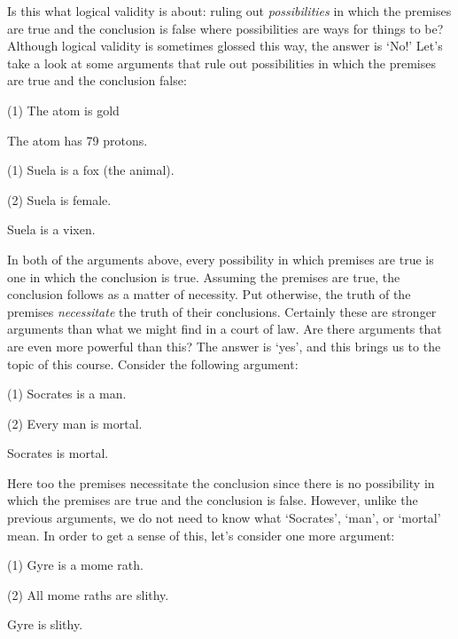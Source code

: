 Is this what logical validity is about: ruling out \textit{possibilities} in which the premises are true and the conclusion is false where possibilities are ways for things to be?
Although logical validity is sometimes glossed this way, the answer is `No!'
Let's take a look at some arguments that rule out possibilities in which the premises are true and the conclusion false:

\begin{earg}
  \item[(1)] The atom is gold
  \item[\therefore] The atom has 79 protons.
\end{earg}


\begin{earg}
  \item[(1)] Suela is a fox (the animal).
  \item[(2)] Suela is female.
  \item[\therefore] Suela is a vixen.
\end{earg}

In both of the arguments above, every possibility in which premises are true is one in which the conclusion is true.
Assuming the premises are true, the conclusion follows as a matter of necessity.
Put otherwise, the truth of the premises \emph{necessitate} the truth of their conclusions.
Certainly these are stronger arguments than what we might find in a court of law.
Are there arguments that are even more powerful than this?
The answer is `yes', and this brings us to the topic of this course.
Consider the following argument:

\begin{earg}
  \item[(1)] Socrates is a man.
  \item[(2)] Every man is mortal.
  \item[\therefore] Socrates is mortal.
\end{earg}

Here too the premises necessitate the conclusion since there is no possibility in which the premises are true and the conclusion is false.
However, unlike the previous arguments, we do not need to know what `Socrates', `man', or `mortal' mean.
In order to get a sense of this, let's consider one more argument:

\begin{earg}
  \item[(1)] Gyre is a mome rath.
  \item[(2)] All mome raths are slithy.
  \item[\therefore] Gyre is slithy.
\end{earg}

